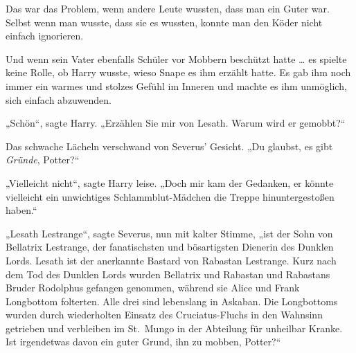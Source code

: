 Das war das Problem, wenn andere Leute wussten, dass man ein Guter war. Selbst wenn man wusste, dass sie es wussten, konnte man den Köder nicht einfach ignorieren.

Und wenn sein Vater ebenfalls Schüler vor Mobbern beschützt hatte … es spielte keine Rolle, ob Harry wusste, wieso Snape es ihm erzählt hatte. Es gab ihm noch immer ein warmes und stolzes Gefühl im Inneren und machte es ihm unmöglich, sich einfach abzuwenden.

„Schön“, sagte Harry.
„Erzählen Sie mir von Lesath. Warum wird er gemobbt?“

Das schwache Lächeln verschwand von Severus’ Gesicht.
„Du glaubst, es gibt \emph{Gründe}, Potter?“

„Vielleicht nicht“, sagte Harry leise.
„Doch mir kam der Gedanken, er könnte vielleicht ein unwichtiges Schlammblut-Mädchen die Treppe hinuntergestoßen haben.“

„Lesath Lestrange“, sagte Severus, nun mit kalter Stimme, „ist der Sohn von Bellatrix Lestrange, der fanatischsten und bösartigsten Dienerin des Dunklen Lords. Lesath ist der anerkannte Bastard von Rabastan Lestrange. Kurz nach dem Tod des Dunklen Lords wurden Bellatrix und Rabastan und Rabastans Bruder Rodolphus gefangen genommen, während sie Alice und Frank Longbottom folterten. Alle drei sind lebenslang in Askaban. Die Longbottoms wurden durch wiederholten Einsatz des Cruciatus-Fluchs in den Wahnsinn getrieben und verbleiben im St.~Mungo in der Abteilung für unheilbar Kranke. Ist irgendetwas davon ein guter Grund, ihn zu mobben, Potter?“

